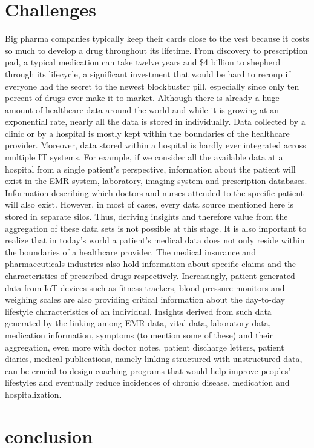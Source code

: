 \documentclass[sigconf]{acmart}
\begin{document}
\section{Challenges}
Big pharma companies typically keep their cards close to the vest because it costs so much to develop a drug throughout its lifetime.  From discovery to prescription pad, a typical medication can take twelve years and \$4 billion to shepherd through its lifecycle, a significant investment that would be hard to recoup if everyone had the secret to the newest blockbuster pill, especially since only ten percent of drugs ever make it to market. Although there is already a huge amount of healthcare data around the world and while it is growing at an exponential rate, nearly all the data is stored in individually. Data collected by a clinic or by a hospital is mostly kept within the boundaries of the healthcare provider. Moreover, data stored within a hospital is hardly ever integrated across multiple IT systems. For example, if we consider all the available data at a hospital from a single patient’s perspective, information about the patient will exist in the EMR system, laboratory, imaging system and prescription databases. Information describing which doctors and nurses attended to the specific patient will also exist. However, in most of cases, every data source mentioned here is stored in separate silos. Thus, deriving insights and therefore value from the aggregation of these data sets is not possible at this stage. It is also important to realize that in today’s world a patient’s medical data does not only reside within the boundaries of a healthcare provider. The medical insurance and pharmaceuticals industries also hold information about specific claims and the characteristics of prescribed drugs respectively. Increasingly, patient-generated data from IoT devices such as fitness trackers, blood pressure monitors and weighing scales are also providing critical information about the day-to-day lifestyle characteristics of an individual. Insights derived from such data generated by the linking among EMR data, vital data, laboratory data, medication information, symptoms (to mention some of these) and their aggregation, even more with doctor notes, patient discharge letters, patient diaries, medical publications, namely linking structured with unstructured data, can be crucial to design coaching programs that would help improve peoples’ lifestyles and eventually reduce incidences of chronic disease, medication and hospitalization.

\section{conclusion}
\end{document}
